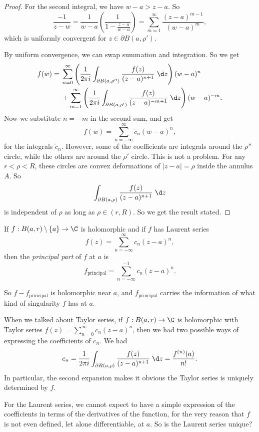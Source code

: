\documentclass[a4paper]{article}
\begin{document}
\begin{proof}
  For the second integral, we have $w - a> z - a$. So
  \[
    \frac{-1}{z - w} = \frac{1}{w - a} \left(\frac{1}{1 - \frac{z - a}{w - a}}\right) = \sum_{m = 1}^\infty \frac{(z - a)^{m - 1}}{(w - a)^m},
  \]
  which is uniformly convergent for $z \in \partial B(a, \rho')$.

  By uniform convergence, we can swap summation and integration. So we get
  \begin{align*}
    f(w) ={}& \sum_{n = 0}^\infty \left(\frac{1}{2 \pi i} \int_{\partial B(a, \rho'')} \frac{f(z)}{(z - a)^{n + 1}} \;\d z\right) (w - a)^n \\
    &+ \sum_{m = 1}^\infty \left(\frac{1}{2\pi i} \int_{\partial B(a, \rho')}\frac{f(z)}{(z - a)^{-m + 1}} \;\d z\right) (w - a)^{-m}.
  \end{align*}
  Now we substitute $n = -m$ in the second sum, and get
  \[
    f(w) = \sum_{n = -\infty}^\infty \tilde{c}_n (w - a)^n,
  \]
  for the integrals $\tilde{c}_n$. However, some of the coefficients are integrals around the $\rho''$ circle, while the others are around the $\rho'$ circle. This is not a problem. For any $r < \rho < R$, these circles are convex deformations of $|z - a| = \rho$ inside the annulus $A$. So
  \[
    \int_{\partial B(a, \rho)} \frac{f(z)}{(z - a)^{n + 1}} \;\d z
  \]
  is independent of $\rho$ as long as $\rho \in (r, R)$. So we get the result stated.
\end{proof}

\begin{defi}
  If $f: B(a, r)\setminus \{a\} \to \C$ is holomorphic and if $f$ has Laurent series
  \[
    f(z) = \sum_{n = -\infty}^\infty c_n (z - a)^n,
  \]
  then the \emph{principal part} of $f$ at $a$ is
  \[
    f_{\mathrm{principal}} = \sum_{n = -\infty}^{-1} c_n (z - a)^n.
  \]
\end{defi}
So $f - f_{\mathrm{principal}}$ is holomorphic near $a$, and $f_{\mathrm{principal}}$ carries the information of what kind of singularity $f$ has at $a$.

When we talked about Taylor series, if $f: B(a, r) \to \C$ is holomorphic with Taylor series $f(z) = \sum_{n = 0}^\infty c_n(z - a)^n$, then we had two possible ways of expressing the coefficients of $c_n$. We had
\[
  c_n = \frac{1}{2\pi i} \int_{\partial B(a, \rho)} \frac{f(z)}{(z - a)^{n + 1}}\;\d z = \frac{f^{(n)}(a)}{n!}.
\]
In particular, the second expansion makes it obvious the Taylor series is uniquely determined by $f$.

For the Laurent series, we cannot expect to have a simple expression of the coefficients in terms of the derivatives of the function, for the very reason that $f$ is not even defined, let alone differentiable, at $a$. So is the Laurent series unique?
\end{document}
